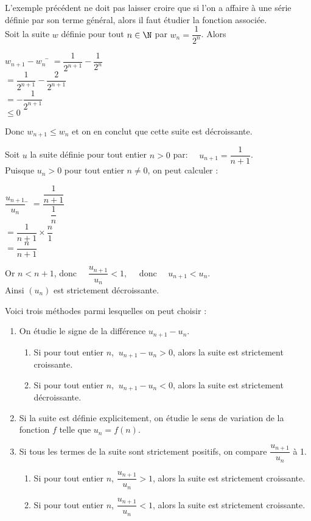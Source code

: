 \documentclass[a4paper,11pt,cours]{nsi} %
\begin{document}
L'exemple précédent ne doit pas laisser croire que si l'on a affaire à une série définie par son terme général, alors il faut étudier la fonction associée.\\
Soit la suite $w$ définie pour tout $n\in\N$ par $w_n=\dfrac{1}{2^n}$. Alors
\begin{tabbing}
	$w_{n+1}-w_n$	\=	$=\dfrac{1}{2^{n+1}}-\dfrac{1}{2^n}$\\
	\>	$=\dfrac{1}{2^{n+1}}-\dfrac{2}{2^{n+1}}$\\
	\>	$=-\dfrac{1}{2^{n+1}}$\\
	\>	$\leqslant 0$
\end{tabbing}
Donc $w_{n+1}\leqslant w_n$ et on en conclut que cette suite est décroissante.

\begin{exemple}
	Soit $u$ la suite définie pour tout entier $n>0$ par: $\quad u_{n+1}=\dfrac{1}{n+1}$.\\
	Puisque $u_n>0$ pour tout entier $n\neq 0$, on peut calculer :
	\begin{tabbing}
		$\dfrac{u_{n+1}}{u_n}$	\=	$=\dfrac{\dfrac{1}{n+1}}{\dfrac{1}{n}}$\\[0.5em]
		\>	$=\dfrac{1}{n+1}\times \dfrac{n}{1}$\\[0.5em]
		\>	$=\dfrac{n}{n+1}$
	\end{tabbing}
	Or $n<n+1$, donc $\quad \dfrac{u_{n+1}}{u_n}<1,\quad$ donc $\quad u_{n+1}<u_n$.\\
	Ainsi $(u_n)$ est strictement décroissante.
\end{exemple}

\begin{methode}
	Voici trois méthodes parmi lesquelles on peut choisir :
	\begin{enumerate}
		\item 	On étudie le signe de la différence $u_{n+1}-u_n$.
		\begin{enumerate}[label=\textbullet]
			\item 	Si pour tout entier $n$, $\ u_{n+1}-u_n >0$, alors la suite est strictement croissante.
			\item 	Si pour tout entier $n$, $\ u_{n+1}-u_n <0$, alors la suite est strictement décroissante.
		\end{enumerate}
		\item 	Si la suite est définie explicitement, on étudie le sens de variation de la fonction $f$ telle que $u_n=f(n)$.
		\item	Si tous les termes de la suite sont strictement positifs, on compare $\dfrac{u_{n+1}}{u_n}$ à 1.
		\begin{enumerate}[label=\textbullet]
			\item 	Si pour tout entier $n$, $\dfrac{u_{n+1}}{u_n}>1$, alors la suite est strictement croissante.
			\item 	Si pour tout entier $n$, $\dfrac{u_{n+1}}{u_n}<1$, alors la suite est strictement croissante.
		\end{enumerate}
	\end{enumerate}
\end{methode}
\end{document}
